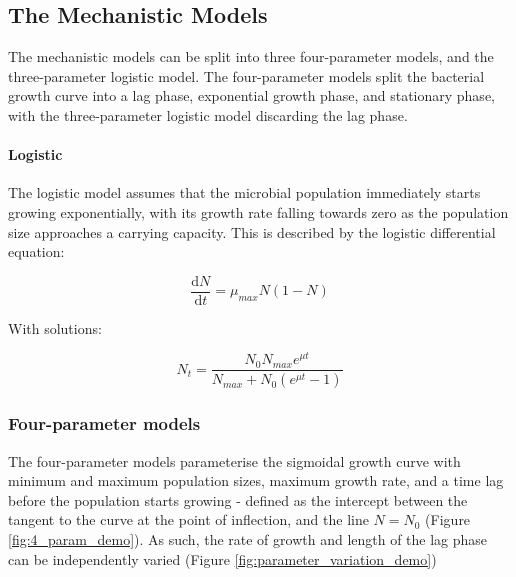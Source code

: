 \documentclass[11pt, a4paper]{article}
\begin{document}
\begin{linenumbers}
\subsection{The Mechanistic Models}

The mechanistic models can be split into three four-parameter models, and the three-parameter logistic model. The four-parameter models split the bacterial growth curve into a lag phase, exponential growth phase, and stationary phase, with the three-parameter logistic model discarding the lag phase.

\paragraph{Logistic}
The logistic model \cite{logisticVel1, logisticVel2} assumes that the microbial population immediately starts growing exponentially, with its growth rate falling towards zero as the population size approaches a carrying capacity. This is described by the logistic differential equation:

\[ \frac{\mathrm d N}{\mathrm d t} =  \mu_{max}N(1-N)  \]

With solutions:

\[ N_t =   \frac{N_0  N_{max} e^{\mu t}}{N_{max} + N_0 (e^{\mu t} - 1)} \]


\subsubsection{Four-parameter models}

The four-parameter models parameterise the sigmoidal growth curve with minimum and maximum population sizes, maximum growth rate, and a time lag before the population starts growing - defined as the intercept between the tangent to the curve at the point of inflection, and the line $N = N_0$ (Figure \ref{fig:4_param_demo}). As such, the rate of growth and length of the lag phase can be independently varied (Figure \ref{fig:parameter_variation_demo})


\end{linenumbers}
\end{document}
